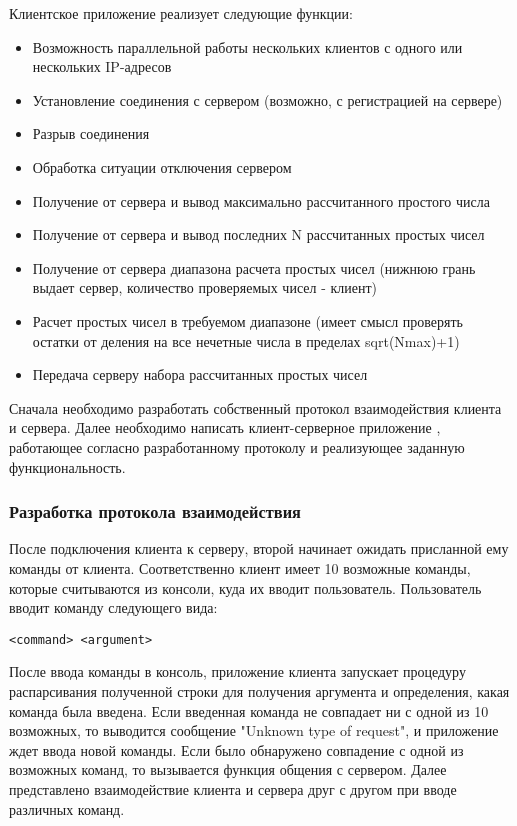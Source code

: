 Клиентское приложение реализует следующие функции:

\begin{itemize}
	\item Возможность параллельной работы нескольких клиентов с одного
	или нескольких IP-адресов
	\item Установление соединения с сервером (возможно, с регистрацией на
	сервере)
	\item Разрыв соединения
	\item Обработка ситуации отключения сервером
	\item Получение от сервера и вывод максимально рассчитанного простого
	числа
	\item Получение от сервера и вывод последних N рассчитанных простых
	чисел
	\item Получение от сервера диапазона расчета простых чисел (нижнюю
	грань выдает сервер, количество проверяемых чисел - клиент)
	\item Расчет простых чисел в требуемом диапазоне (имеет смысл проверять остатки от деления на все нечетные числа в пределах
	sqrt(Nmax)+1)
	\item Передача серверу набора рассчитанных простых чисел
\end{itemize}

Сначала необходимо разработать собственный протокол взаимодействия клиента и сервера. Далее необходимо написать клиент-серверное приложение , работающее согласно разработанному протоколу и реализующее заданную функциональность.
\subsubsection{Разработка протокола взаимодействия}
После подключения клиента к серверу, второй начинает ожидать присланной ему команды от клиента. Соответственно клиент имеет 10 возможные команды, которые считываются из консоли, куда их вводит пользователь. Пользователь вводит команду следующего вида:
\begin{lstlisting}
<command> <argument>
\end{lstlisting}
После ввода команды в консоль, приложение клиента запускает процедуру распарсивания полученной строки для получения аргумента и определения, какая команда была введена. Если введенная команда не совпадает ни с одной из 10 возможных, то выводится сообщение "Unknown type of request", и приложение ждет ввода новой команды. Если было обнаружено совпадение с одной из возможных команд, то вызывается функция общения с сервером. Далее представлено взаимодействие клиента и сервера друг с другом при вводе различных команд.

